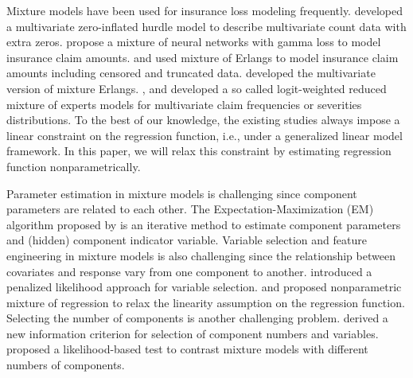 \documentclass[11pt]{article}
\numberwithin{equation}{section}
\begin{document}
Mixture models have been used for insurance loss modeling frequently.
\citet{zhang2020type, zhang2022new} developed a multivariate zero-inflated hurdle model to describe multivariate count data with extra zeros.
\citet{delong2021gamma} propose a mixture of neural networks with gamma loss to model insurance claim amounts.
\citet{verbelen2015fitting} and \citet{lee2010modeling} used mixture of Erlangs to model insurance claim amounts including censored and truncated data.
\citet{lee2012modeling} developed the multivariate version of mixture Erlangs.
\citet{fung2019class}, \citet{fung2019class2} and \citet{tseung2021lrmoe} developed a so called logit-weighted reduced mixture of experts models for multivariate claim frequencies or severities distributions.
To the best of our knowledge, the existing studies always impose a linear constraint on the regression function, i.e., under a generalized linear model framework.
In this paper, we will relax this constraint by estimating regression function nonparametrically.

Parameter estimation in mixture models is challenging since component parameters are related to each other. 
The Expectation-Maximization (EM) algorithm proposed by \citet{dempster1977maximum} is an iterative method to estimate component parameters and (hidden) component indicator variable. 
Variable selection and feature engineering in mixture models  is also challenging since the relationship between covariates and response vary from one component to another.  
\citet{khalili2007variable} introduced a penalized likelihood approach for variable selection.
\citet{huang2013nonparametric} and \citet{huang2012mixture} proposed nonparametric mixture of regression to relax the linearity assumption on the regression function.
Selecting the number of components is another challenging problem.
\citet{naik2007extending} derived a new information criterion for selection of component numbers and variables.
\citet{kasahara2015testing} proposed a likelihood-based test to contrast mixture models with different numbers of components. 
\end{document}
